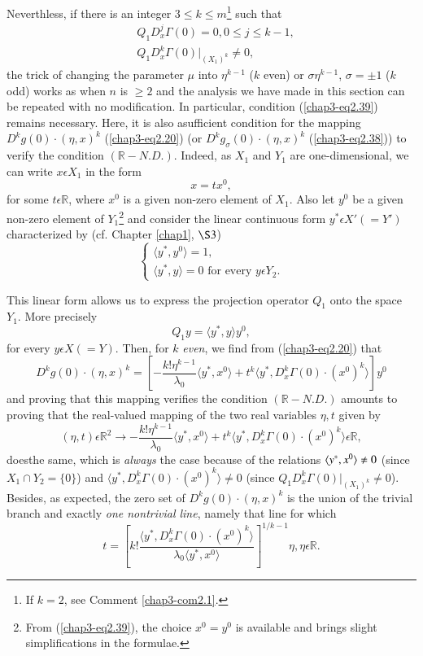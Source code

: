 Neverthless, if there is an integer $3 \leq k \leq m$\footnote{If $k =
  2$, see Comment \ref{chap3-com2.1}.} such that
\begin{align*}
& Q_{1}D_{x}^{j}\Gamma(0) = 0, 0 \leq j \leq k-1,\\
& Q_{1}D_{x}^{k}\Gamma(0) |_{(X_{1})^{k}} \neq 0,\tag{2.40}\label{chap3-eq2.40}
\end{align*}
the trick of changing the parameter $\mu$ into $\eta^{k-1}$ ($k$ even)
or $\sigma \eta^{k-1}$, $\sigma = \pm 1$ ($k$ odd) works as when $n$ is
$\geq 2$ and the analysis we have made in this section can be repeated
with no modification. In particular, condition (\ref{chap3-eq2.39})
remains necessary. Here, it is also a\pageoriginale sufficient
condition for the mapping $D^{k}g(0) \cdot (\eta, x)^{k}$
(\ref{chap3-eq2.20}) (or $D^{k}g_{\sigma}(0) \cdot (\eta, x)^{k}$
(\ref{chap3-eq2.38})) to verify the condition
$(\mathbb{R}-N.D.)$. Indeed, as $X_{1}$ and $Y_{1}$ are
one-dimensional, we can write $x \epsilon X_{1}$ in the form
$$
x = tx^{0}, 
$$
for some $t \epsilon \mathbb{R}$, where $x^{0}$ is a given non-zero
element of $X_{1}$. Also let $y^{0}$ be a given non-zero element of
$Y_{1}$\footnote{From (\ref{chap3-eq2.39}), the choice $x^{0} = y^{0}$
is available and brings slight simplifications in the formulae.} and
consider the linear continuous form $y^{*} \epsilon X'(= Y')$
characterized by (cf. Chapter \ref{chap1}, $\S 3$)
\begin{equation*}
\begin{cases}
\langle y^{*}, y^{0} \rangle  = 1,\\
\langle y^{*}, y \rangle  = 0 \text{ for every } y \epsilon Y_{2}.
\end{cases}
\end{equation*}

This linear form allows us to express the projection operator $Q_{1}$
onto the space $Y_{1}$. More precisely
$$
Q_{1}y = \langle y^{*}, y \rangle y^{0},
$$
for every $y \epsilon X(= Y)$. Then, for $k$ {\em even}, we find from
(\ref{chap3-eq2.20}) that 
$$ 
D^{k}g(0) \cdot (\eta, x)^{k} = \left[-\frac{k!
     \eta^{k-1}}{\lambda_{0}} \langle y^{*}, x^{0} \rangle  + t^{k} \langle y^{*},
  D_{x}^{k}\Gamma(0) \cdot (x^{0})^{k} \rangle \right]y^{0}
$$
and proving that this mapping verifies the condition
$(\mathbb{R}-N.D.)$ amounts to proving that the real-valued mapping of
the two real variables $\eta, t$ given by
$$ 
(\eta, t) \epsilon \mathbb{R}^{2} \to - \frac{k!
  \eta^{k-1}}{\lambda_{0}} \langle y^{*}, x^{0}\rangle  + t^{k} \langle y^{*},
D_{x}^{k}\Gamma(0) \cdot (x^{0})^{k} \rangle  \epsilon \mathbb{R},
$$
does\pageoriginale the same, which is {\em always} the case because of
the relations $\langle y^{*},\break x^{0} \rangle  \neq 0$ (since $X_{1} \cap Y_{2} =
\{0\}$) and $\langle y^{*}, D_{x}^{k}\Gamma(0) \cdot (x^{0})^{k} \rangle  \neq 0$
(since $Q_{1}D_{x}^{k}\Gamma(0) |_{(X_{1})^{k}} \neq 0$). Besides, as
expected, the zero set of $D^{k}g(0) \cdot (\eta, x)^{k}$ is the union
of the trivial branch and exactly {\em one nontrivial line}, namely
that line for which
$$ 
t = \left[k! \frac{\langle y^{*}, D_{x}^{k}\Gamma(0) \cdot
    (x^{0})^{k} \rangle }{\lambda_{0} \langle y^{*}, x^{0} \rangle }\right]^{1/k-1} \eta,
\eta \epsilon \mathbb{R}.
$$

